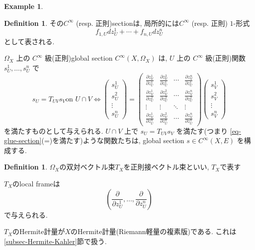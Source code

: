 \documentclass[dvipdfmx,a4paper,11pt]{article} %
\theoremstyle{definition}
\newtheorem{defn}[thm]{Definition}
\newtheorem{example}[thm]{Example}
\theoremstyle{remark}
\numberwithin{equation}{section}
\begin{document}
\begin{example}
\begin{defn}
その$C^{\infty}$ (resp. 正則)sectionは, 局所的には$C^{\infty}$ (resp. 正則) \(1\)-形式
\[
f_{1,U} dz_U^1 + \cdots + f_{n,U}dz_U^n
\]
として表される.
\end{defn}

\(\Omega_{X}\) 上の \(C^{\infty}\) 級(正則)global section \(C^{\infty}(X, \Omega_{X})\) は, \(U\) 上の \(C^{\infty}\) 級(正則)関数
\(s_U^1, \ldots,s_U^n\) で
\[
s_U=T_{UV}s_V \text{on $U\cap V$}
\Leftrightarrow 
\begin{pmatrix}
s_U^1\\
s_U^2\\
\vdots\\
s_U^n
\end{pmatrix}
=
\begin{pmatrix}
\frac{\partial z_V^1}{\partial z_U^1}
& \frac{\partial z_V^2}{\partial z_U^1}& \cdots 
& \frac{\partial z_V^n}{\partial z_U^1}\\
\frac{\partial z_V^1}{\partial z_U^2}& \frac{\partial z_V^2}{\partial z_U^2}& \cdots & \frac{\partial z_V^n}{\partial z_U^2}\\
\vdots & \vdots & \ddots & \vdots\\
\frac{\partial z_V^1}{\partial z_U^n}& \frac{\partial z_V^2}{\partial z_U^n}& \cdots & \frac{\partial z_V^n}{\partial z_U^n}
\end{pmatrix}
\begin{pmatrix}
s_V^1\\
s_V^2\\
\vdots\\
s_V^n
\end{pmatrix}
\]
を満たすものとして与えられる. \(U\cap V\) 上で \(s_U=T_{UV}s_V\) を満たす(つまり \eqref{eq-glue-section}(=)を満たす)ような関数たちは, global section \(s\in C^\infty(X,E)\) を構成する.
\begin{defn}
$\Omega_{X}$の双対ベクトル束$T_X$を正則接ベクトル束といい, $T_X$で表す 
\end{defn}
$T_X$のlocal frameは
$$
\left(\frac{\partial}{\partial z_U^1}, \ldots, \frac{\partial}{\partial z_U^n}
\right)
$$
で与えられる. 

$T_X$のHermite計量が$X$のHermite計量(Riemann軽量の複素版)である. これは\ref{subsec-Hermite-Kahler}節で扱う.
\end{example}
\end{document}
